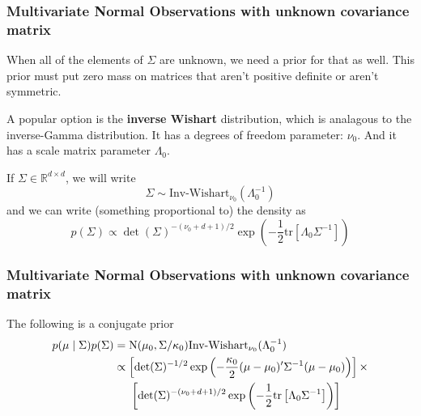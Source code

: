 \documentclass{beamer}
\begin{document}
\begin{frame}[fragile]
\frametitle{Multivariate Normal Observations with unknown covariance matrix}

When all of the elements of $\Sigma$ are unknown, we need a prior for that as well. This prior must put zero mass on matrices that aren't positive definite or aren't symmetric. 
\newline

A popular option is the {\bf inverse Wishart} distribution, which is analagous to the inverse-Gamma distribution. It has a degrees of freedom parameter: $\nu_0$. And it has a scale matrix parameter $\Lambda_0$. 
\newline
\pause

If $\Sigma \in \mathbb{R}^{d \times d}$, we will write
$$
\Sigma \sim \text{Inv-Wishart}_{\nu_0}(\Lambda_0^{-1})
$$
and we can write (something proportional to) the density as 
$$
p(\Sigma) \propto \det(\Sigma)^{-(\nu_0 + d + 1)/2}\exp\left( -\frac{1}{2} \text{tr}\left[\Lambda_0 \Sigma^{-1} \right] \right)
$$

\end{frame}

\begin{frame}[fragile]
\frametitle{Multivariate Normal Observations with unknown covariance matrix}

The following is a conjugate prior
\begin{align*}
p(\mu \mid \Sigma)p(\Sigma) &= \text{N}(\mu_0, \Sigma / \kappa_0)\text{Inv-Wishart}_{\nu_0}(\Lambda_0^{-1}) \\
&\propto \left[\det(\Sigma)^{-1/2}\exp\left(-\frac{\kappa_0}{2}(\mu - \mu_0)'\Sigma^{-1}(\mu - \mu_0) \right) \right] \times \\
& \hspace{5mm} \left[   \det(\Sigma)^{-(\nu_0 + d + 1)/2}\exp\left( -\frac{1}{2} \text{tr}\left[\Lambda_0 \Sigma^{-1} \right] \right) \right]
\end{align*}

\end{frame}
\end{document}
